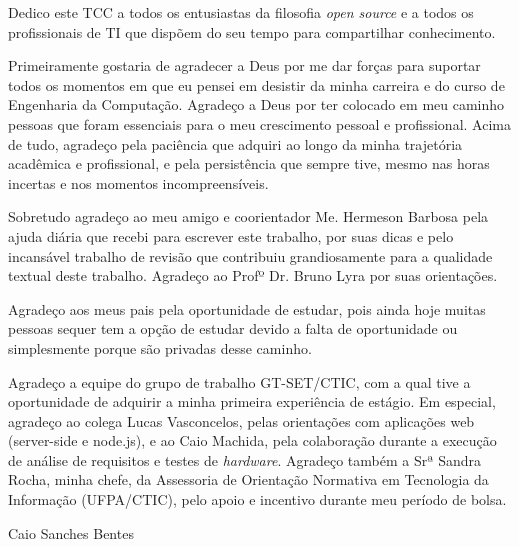 \documentclass{./template/ufpatccdoisautores}
\begin{document}

\ufpaCapa
\ufpaPaginaDeRosto
\ufpaPaginaDeAprovacao

\begin{ufpaOferecimento}
%
Dedico este TCC a todos os entusiastas da filosofia \textit{open source} e a todos os profissionais de TI que dispõem do seu tempo para compartilhar conhecimento.
\end{ufpaOferecimento}


\begin{ufpaAgradecimentos}


Primeiramente gostaria de agradecer a Deus por me dar forças para suportar todos os momentos em que eu pensei em desistir da minha carreira e do curso de Engenharia da Computação. Agradeço a Deus por ter colocado em meu caminho pessoas que foram essenciais para o meu crescimento pessoal e profissional. Acima de tudo, agradeço pela paciência que adquiri ao longo da minha trajetória acadêmica e profissional, e pela persistência que sempre tive, mesmo nas horas incertas e nos momentos incompreensíveis.   

Sobretudo agradeço ao meu amigo e coorientador Me. Hermeson Barbosa pela ajuda diária que recebi para escrever este trabalho, por suas dicas e pelo incansável trabalho de revisão que contribuiu grandiosamente para a qualidade textual deste trabalho. Agradeço ao Profº Dr. Bruno Lyra por suas orientações.

Agradeço aos meus pais pela oportunidade de estudar, pois ainda hoje muitas pessoas sequer tem a opção de estudar devido a falta de oportunidade ou simplesmente porque são privadas desse caminho.

Agradeço a equipe do grupo de trabalho GT-SET/CTIC, com a qual tive a oportunidade de adquirir a minha primeira experiência de estágio. Em especial, agradeço ao colega Lucas Vasconcelos, pelas orientações com aplicações web (server-side  e node.js), e ao Caio Machida, pela colaboração durante a execução de análise de requisitos e testes de \textit{hardware}. Agradeço também a Srª Sandra Rocha, minha chefe, da Assessoria de Orientação Normativa em Tecnologia da Informação (UFPA/CTIC), pelo apoio e incentivo durante meu período de bolsa.


\begin{flushright}
Caio Sanches Bentes
\end{flushright}

\end{ufpaAgradecimentos}
\end{document}
